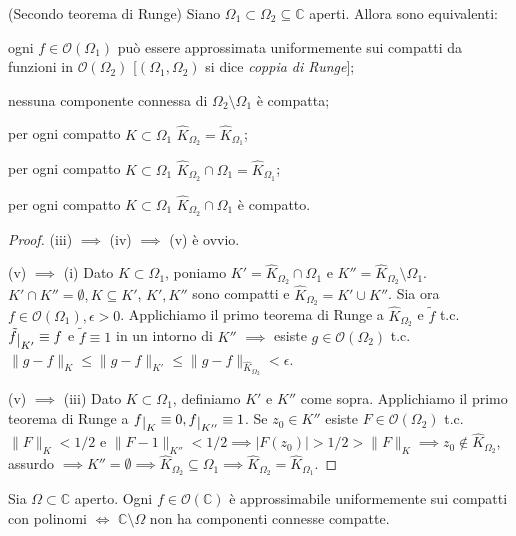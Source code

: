 \begin{thm}
  (Secondo teorema di Runge) Siano $\Omega_1 \subset \Omega_2 \subseteq \mathbb{C}$ aperti. Allora sono equivalenti:
  \begin{nlist}
    \item ogni $f \in \mathcal{O}(\Omega_1)$ può essere approssimata uniformemente sui compatti da funzioni in $\mathcal{O}(\Omega_2)$ [$(\Omega_1, \Omega_2)$ si dice \textit{coppia di Runge}];
    \item nessuna componente connessa di $\Omega_2\setminus\Omega_1$ è compatta;
    \item per ogni compatto $K \subset \Omega_1$ $\widehat{K}_{\Omega_2}=\widehat{K}_{\Omega_1}$;
    \item per ogni compatto $K \subset \Omega_1$ $\widehat{K}_{\Omega_2}\cap \Omega_1=\widehat{K}_{\Omega_1}$;
    \item per ogni compatto $K \subset \Omega_1$ $\widehat{K}_{\Omega_2}\cap \Omega_1$ è compatto.
  \end{nlist}
\end{thm}

\begin{proof}
  (iii) $\implies$ (iv) $\implies$ (v) è ovvio.

  (v) $\implies$ (i) Dato $K \subset \Omega_1$, poniamo $K'=\widehat{K}_{\Omega_2} \cap \Omega_1$ e $K''=\widehat{K}_{\Omega_2} \setminus \Omega_1$. $K' \cap K''=\emptyset, K \subseteq K'$, $K', K''$ sono compatti e $\widehat{K}_{\Omega_2}=K'\cup K''$.
  Sia ora $f \in \mathcal{O}(\Omega_1), \epsilon>0$. Applichiamo il primo teorema di Runge a $\widehat{K}_{\Omega_2}$ e $\tilde{f}$ t.c. $\tilde{f}\restrict{K'}\equiv f$ e $\tilde{f}\equiv 1$ in un intorno di $K''$ $\implies$ esiste $g \in \mathcal{O}(\Omega_2)$ t.c. $\|g-f\|_K \le \|g-f\|_{K'} \le \|g-f\|_{\widehat{K}_{\Omega_2}}<\epsilon$.

  (v) $\implies$ (iii) Dato $K \subset \Omega_1$, definiamo $K'$ e $K''$ come sopra. Applichiamo il primo teorema di Runge a $f\restrict{K} \equiv 0, f\restrict{K''}\equiv 1$.
  Se $z_0 \in K''$ esiste $F \in \mathcal{O}(\Omega_2)$ t.c. $\|F\|_K<1/2$ e $\|F-1\|_{K''}<1/2 \implies |F(z_0)|>1/2>\|F\|_K \implies z_0 \not\in \widehat{K}_{\Omega_2}$, assurdo $\implies K''=\emptyset \implies \widehat{K}_{\Omega_2} \subseteq \Omega_1 \implies \widehat{K}_{\Omega_2}=\widehat{K}_{\Omega_1}$.
\end{proof}

\begin{cor}
  Sia $\Omega \subset \mathbb{C}$ aperto. Ogni $f \in \mathcal{O}(\mathbb{C})$ è approssimabile uniformemente sui compatti con polinomi $\iff$ $\mathbb{C}\setminus \Omega$ non ha componenti connesse compatte.
\end{cor}

